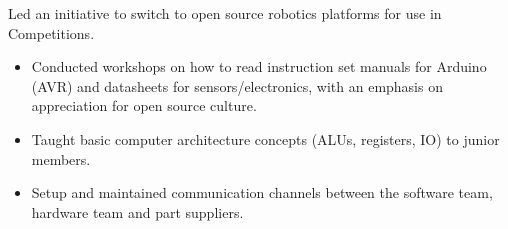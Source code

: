 Led an initiative to switch to open source robotics platforms for use in Competitions. 
\medskip
\begin{itemize}
  \item Conducted workshops on how to read instruction set manuals for Arduino (AVR) and datasheets for sensors/electronics, with an emphasis on appreciation for open source culture.
  \item Taught basic computer architecture concepts (ALUs, registers, IO) to junior members.
  \item Setup and maintained communication channels between the software team, hardware team and part suppliers.
\end{itemize}